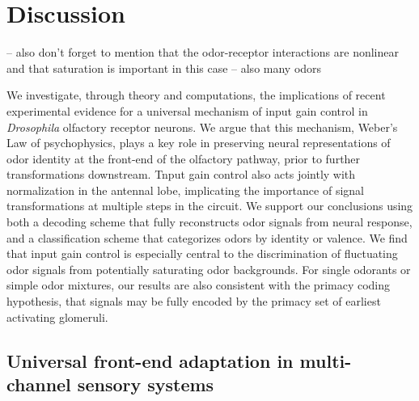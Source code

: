 



\section{Discussion}

{\color {blue}-- also don't forget to mention that the odor-receptor  interactions are nonlinear and that saturation is important in this case -- also many odors}


We investigate, through theory and computations, the implications of recent experimental evidence for a universal mechanism of input gain control in \textit{Drosophila} olfactory receptor neurons. We argue that this mechanism, Weber's Law of psychophysics, plays a key role in preserving neural representations of odor identity at the front-end of the olfactory pathway, prior to further transformations downstream. Tnput gain control also acts jointly with normalization in the antennal lobe, implicating the importance of signal transformations at multiple steps in the circuit. We support our conclusions using both a decoding scheme that fully reconstructs odor signals from neural response, and a classification scheme that categorizes odors by identity or valence. We find that input gain control is especially central to the discrimination of fluctuating odor signals from potentially saturating odor backgrounds. For single odorants or simple odor mixtures, our results are also consistent with the primacy coding hypothesis, that signals may be fully encoded by the primacy set of earliest activating glomeruli. %

\subsection{Universal front-end adaptation in multi-channel sensory systems}

